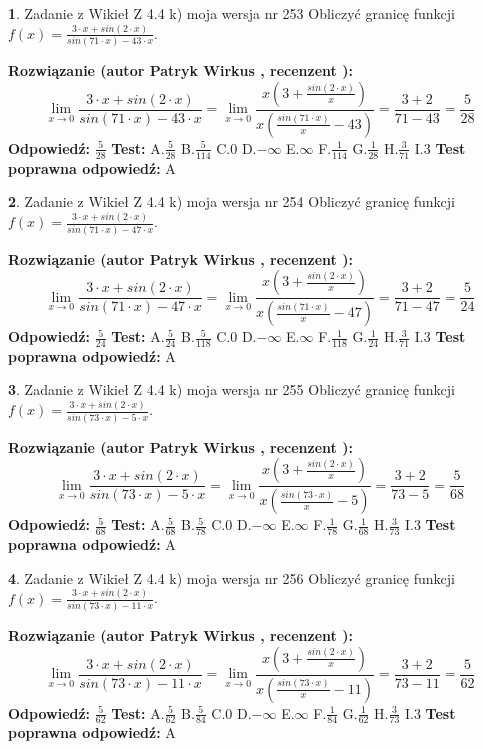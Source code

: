 \documentclass[12pt, a4paper]{article}
\theoremstyle{definition} %
\newtheorem{zad}{}
\newcommand{\zadStart}[1]{\begin{zad}#1\newline}
\newcommand{\zadStop}{\end{zad}}
\newcommand{\rozwStart}[2]{\noindent \textbf{Rozwiązanie (autor #1 , recenzent #2): }\newline}
\newcommand{\rozwStop}{\newline}
\newcommand{\odpStart}{\noindent \textbf{Odpowiedź:}\newline}
\newcommand{\odpStop}{\newline}
\newcommand{\testStart}{\noindent \textbf{Test:}\newline}
\newcommand{\testStop}{\newline}
\newcommand{\kluczStart}{\noindent \textbf{Test poprawna odpowiedź:}\newline}
\newcommand{\kluczStop}{\newline}
\begin{document}
\zadStart{Zadanie z Wikieł Z 4.4 k) moja wersja nr 253}
Obliczyć granicę funkcji $f(x)=\frac{3\cdot x +sin(2\cdot x)}{sin(71\cdot x) -43\cdot x}$.
\zadStop
\rozwStart{Patryk Wirkus}{}
$$\lim\limits_{x\to 0}\frac{3\cdot x +sin(2\cdot x)}{sin(71\cdot x) -43\cdot x}
=\lim\limits_{x\to 0}\frac{x(3+\frac{sin(2\cdot x)}{x})}{x(\frac{sin(71\cdot x)}{x}-43)}
=\frac{3+2}{71-43} = \frac{5}{28}$$
\rozwStop
\odpStart
$\frac{5}{28}$
\odpStop
\testStart
A.$\frac{5}{28}$
B.$\frac{5}{114}$
C.$0$
D.$-\infty$
E.$\infty$
F.$\frac{1}{114}$
G.$\frac{1}{28}$
H.$\frac{3}{71}$
I.$3$
\testStop
\kluczStart
A
\kluczStop



\zadStart{Zadanie z Wikieł Z 4.4 k) moja wersja nr 254}
Obliczyć granicę funkcji $f(x)=\frac{3\cdot x +sin(2\cdot x)}{sin(71\cdot x) -47\cdot x}$.
\zadStop
\rozwStart{Patryk Wirkus}{}
$$\lim\limits_{x\to 0}\frac{3\cdot x +sin(2\cdot x)}{sin(71\cdot x) -47\cdot x}
=\lim\limits_{x\to 0}\frac{x(3+\frac{sin(2\cdot x)}{x})}{x(\frac{sin(71\cdot x)}{x}-47)}
=\frac{3+2}{71-47} = \frac{5}{24}$$
\rozwStop
\odpStart
$\frac{5}{24}$
\odpStop
\testStart
A.$\frac{5}{24}$
B.$\frac{5}{118}$
C.$0$
D.$-\infty$
E.$\infty$
F.$\frac{1}{118}$
G.$\frac{1}{24}$
H.$\frac{3}{71}$
I.$3$
\testStop
\kluczStart
A
\kluczStop



\zadStart{Zadanie z Wikieł Z 4.4 k) moja wersja nr 255}
Obliczyć granicę funkcji $f(x)=\frac{3\cdot x +sin(2\cdot x)}{sin(73\cdot x) -5\cdot x}$.
\zadStop
\rozwStart{Patryk Wirkus}{}
$$\lim\limits_{x\to 0}\frac{3\cdot x +sin(2\cdot x)}{sin(73\cdot x) -5\cdot x}
=\lim\limits_{x\to 0}\frac{x(3+\frac{sin(2\cdot x)}{x})}{x(\frac{sin(73\cdot x)}{x}-5)}
=\frac{3+2}{73-5} = \frac{5}{68}$$
\rozwStop
\odpStart
$\frac{5}{68}$
\odpStop
\testStart
A.$\frac{5}{68}$
B.$\frac{5}{78}$
C.$0$
D.$-\infty$
E.$\infty$
F.$\frac{1}{78}$
G.$\frac{1}{68}$
H.$\frac{3}{73}$
I.$3$
\testStop
\kluczStart
A
\kluczStop



\zadStart{Zadanie z Wikieł Z 4.4 k) moja wersja nr 256}
Obliczyć granicę funkcji $f(x)=\frac{3\cdot x +sin(2\cdot x)}{sin(73\cdot x) -11\cdot x}$.
\zadStop
\rozwStart{Patryk Wirkus}{}
$$\lim\limits_{x\to 0}\frac{3\cdot x +sin(2\cdot x)}{sin(73\cdot x) -11\cdot x}
=\lim\limits_{x\to 0}\frac{x(3+\frac{sin(2\cdot x)}{x})}{x(\frac{sin(73\cdot x)}{x}-11)}
=\frac{3+2}{73-11} = \frac{5}{62}$$
\rozwStop
\odpStart
$\frac{5}{62}$
\odpStop
\testStart
A.$\frac{5}{62}$
B.$\frac{5}{84}$
C.$0$
D.$-\infty$
E.$\infty$
F.$\frac{1}{84}$
G.$\frac{1}{62}$
H.$\frac{3}{73}$
I.$3$
\testStop
\kluczStart
A
\kluczStop
\end{document}
